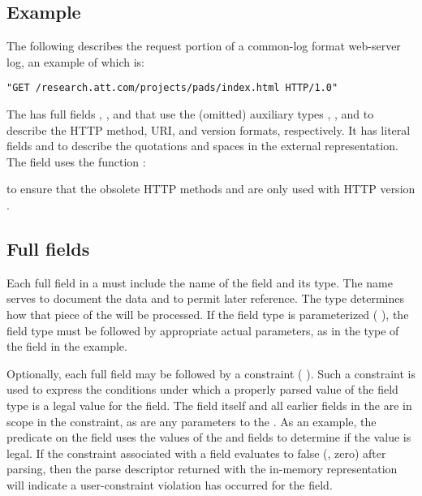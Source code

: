\subsection{Example}
The following \pads{} \struct{} describes the request portion of a
common-log format web-server log, an example of which is:
\begin{verbatim}
"GET /research.att.com/projects/pads/index.html HTTP/1.0"
\end{verbatim}

\noindent
The \struct{}  has full fields ,
, and  that use the (omitted) auxiliary types
,
, and
 to describe
the HTTP method, URI, and  version formats, respectively.  
It has literal fields  and
 to describe the quotations and spaces in the external
representation. 
The  field uses the \C{}
function :

to ensure that the obsolete HTTP methods
 and  are only used with HTTP version .

\subsection{Full fields}
Each full field in a \struct{} must include the name of the field
and its type.  
The name serves to document the data and to permit later reference.  
The type determines how that piece of the \struct{} will be
processed.  If the field type is parameterized 
(\cf{} ), the field type must be
followed by appropriate actual parameters, as in the  type
of the  field in the  example.

Optionally, each full field may be followed by a constraint (\cf{}
).  Such a constraint is used to express
the conditions under which a properly parsed value of the field type
is a legal value for the field.  The field itself and all earlier
fields in the \struct{} are in scope in the constraint, as are any
parameters to the \struct{}.  As an example, the 
predicate on the  field uses the values of the 
and  fields to determine if the  value is
legal.  If the constraint associated with a field evaluates to false
(\ie{}, zero) after parsing, then the parse descriptor returned with
the in-memory representation will indicate a user-constraint violation
has occurred for the field.

